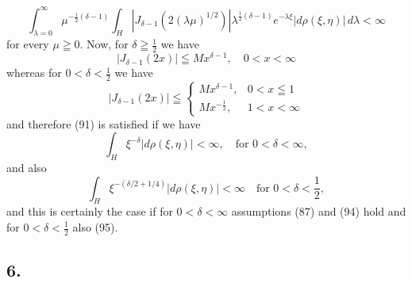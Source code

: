 \documentclass[12pt]{article}
\begin{document}
\begin{equation}
\int_{\lambda=0}^{\infty} \mu^{-\frac{1}{2}(\delta-1)} \int_H |J_{\delta-1}(2(\lambda\mu)^{1/2})| \lambda^{\frac{1}{2}(\delta-1)} e^{-\lambda\xi} |d\rho(\xi, \eta)| \, d\lambda < \infty
\tag{91}
\end{equation}
for every \(\mu \geqq 0\). Now, for \(\delta \geqq \frac{1}{2}\) we have
\begin{equation}
|J_{\delta-1}(2x)| \leqq M x^{\delta-1}, \quad 0 < x < \infty
\tag{92}
\end{equation}
whereas for \(0 < \delta < \frac{1}{2}\) we have
\begin{equation}
|J_{\delta-1}(2x)| \leqq
\begin{cases}
M x^{\delta-1}, & 0 < x \leqq 1 \\
M x^{-\frac{1}{2}}, & 1 < x < \infty
\end{cases}
\tag{93}
\end{equation}
and therefore (91) is satisfied if we have
\begin{equation}
\int_H \xi^{-\delta} | d\rho(\xi, \eta) | < \infty, \quad \text{for } 0 < \delta < \infty,
\tag{94}
\end{equation}
and also
\begin{equation}
\int_H \xi^{-(\delta/2+1/4)} | d\rho(\xi, \eta) | < \infty \quad \text{for } 0 < \delta < \frac{1}{2},
\tag{95}
\end{equation}
and this is certainly the case if for \(0 < \delta < \infty\) assumptions (87) and (94) hold and for \(0 < \delta < \frac{1}{2}\) also (95).

\subsection*{6.}
\end{document}
